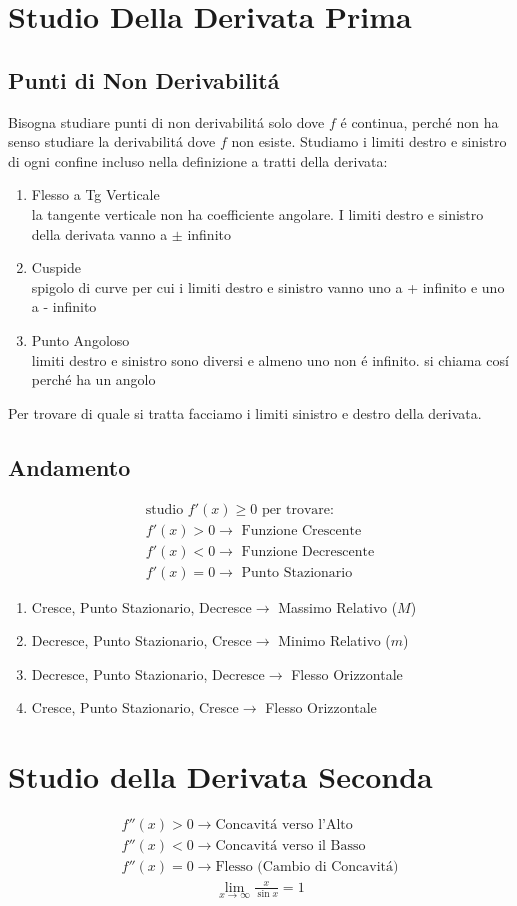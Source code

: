 \documentclass{article}
\begin{document}
\section{Studio Della Derivata Prima}
\subsection{Punti di Non Derivabilitá}
Bisogna studiare punti di non derivabilitá solo dove $f$ é continua, perché non ha senso studiare la derivabilitá dove $f$ non esiste. Studiamo i limiti destro e sinistro di ogni confine incluso nella definizione a tratti della derivata:
\begin{enumerate}
    \item Flesso a Tg Verticale\\
    la tangente verticale non ha coefficiente angolare. I limiti destro e sinistro della derivata vanno a $\pm$ infinito
    \item Cuspide\\
    spigolo di curve per cui i limiti destro e sinistro vanno uno a + infinito e uno a - infinito
    \item Punto Angoloso\\
    limiti destro e sinistro sono diversi e almeno uno non é infinito. si chiama cosí perché ha un angolo
\end{enumerate}
Per trovare di quale si tratta facciamo i limiti sinistro e destro della derivata.
\subsection{Andamento}
\begin{gather*}
    \text{studio }f'(x)\geq 0\text{ per trovare:}\\
    f'(x)>0\to \text{ Funzione Crescente}\\
    f'(x)<0\to \text{ Funzione Decrescente}\\
    f'(x)=0\to\text{ Punto Stazionario}
\end{gather*}
\begin{enumerate}
    \item Cresce, Punto Stazionario, Decresce$\to$ Massimo Relativo ($M$)
    \item Decresce, Punto Stazionario, Cresce$\to$ Minimo Relativo ($m$)
    \item Decresce, Punto Stazionario, Decresce$\to$ Flesso Orizzontale
    \item Cresce, Punto Stazionario, Cresce$\to$ Flesso Orizzontale
\end{enumerate}
\section{Studio della Derivata Seconda}
\begin{gather*}
    f''(x)>0\to\text{Concavitá verso l'Alto}\\
    f''(x)<0\to\text{Concavitá verso il Basso}\\
    f''(x)=0\to\text{Flesso (Cambio di Concavitá)}
\end{gather*}
\begin{gather*}
    \lim_{x\to\infty}\frac{x}{\sin x}=1
\end{gather*}
\end{document}
